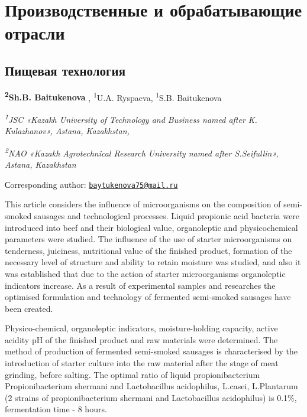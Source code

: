 \newpage
\let\cleardoublepage\clearpage
\part{Производственные и обрабатывающие отрасли}
\chapter{Пищевая технология}

\begin{articleheader}

{\bfseries \textsuperscript{2}Sh.B. Baitukenova} \authorid,
\textsuperscript{1}U.A. Ryspaeva\authorid,
\textsuperscript{1}S.B. Baitukenova\authorid
\end{articleheader}

\begin{affiliation}
\emph{\textsuperscript{1}JSC «Kazakh University of Technology and
Business named after K. Kulazhanov», Astana, Kazakhstan,}

\emph{\textsuperscript{2}NAO «Kazakh Agrotechnical Research University
named after S.Seifullin», Astana, Kazakhstan}

\raggedright {\bfseries \textsuperscript{\envelope }}Сorresponding author: \href{mailto:baytukenova75@mail.ru}{\nolinkurl{baytukenova75@mail.ru}}
\end{affiliation}

This article considers the influence of microorganisms on the
composition of semi-smoked sausages and technological processes. Liquid
propionic acid bacteria were introduced into beef and their biological
value, organoleptic and physicochemical parameters were studied. The
influence of the use of starter microorganisms on tenderness, juiciness,
nutritional value of the finished product, formation of the necessary
level of structure and ability to retain moisture was studied, and also
it was established that due to the action of starter microorganisms
organoleptic indicators increase. As a result of experimental samples
and researches the optimised formulation and technology of fermented
semi-smoked sausages have been created.

Physico-chemical, organoleptic indicators, moisture-holding capacity,
active acidity pH of the finished product and raw materials were
determined. The method of production of fermented semi-smoked sausages
is characterised by the introduction of starter culture into the raw
material after the stage of meat grinding, before salting. The optimal
ratio of liquid propionibacterium Propionibacterium shermani and
Lactobacillus acidophilus, L.casei, L.Plantarum (2 strains of
propionibacterium shermani and Lactobacillus acidophilus) is 0.1\%,
fermentation time - 8 hours.

